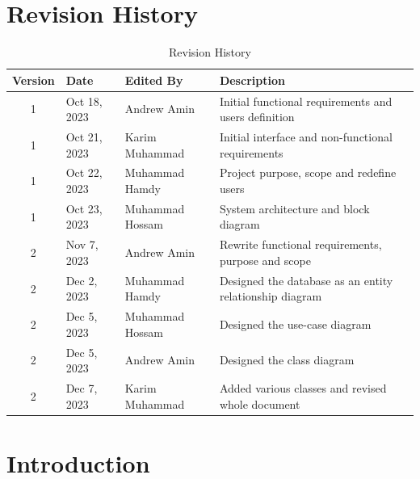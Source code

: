 \documentclass{BusMateSRS}
\def\nameAndrew{Andrew Amin}
\def\nameKarim{Karim Muhammad}
\def\nameHamdy{Muhammad Hamdy}
\def\nameHossam{Muhammad Hossam}
\begin{document}
\maketitle
\tableofcontents
\listoffigures
\listoftables

\chapter*{Revision History}
\begin{table}[h!]
  \centering
  \begin{tabularx}{\textwidth}{|c|l|l|X|}
    \hline
    \textbf{Version} & \textbf{Date} & \textbf{Edited By} & \textbf{Description} \\
    \hline
    1 & Oct 18, 2023 & \nameAndrew & 
    Initial functional requirements and users definition \\
    \hline
    1 & Oct 21, 2023 & \nameKarim & 
    Initial interface and non-functional requirements \\
    \hline
    1 & Oct 22, 2023 & \nameHamdy &
    Project purpose, scope and redefine users \\
    \hline
    1 & Oct 23, 2023 & \nameHossam &
    System architecture and block diagram \\
    \hline
    2 & Nov 7, 2023 & \nameAndrew & 
    Rewrite functional requirements, purpose and scope \\
    \hline
    2 & Dec 2, 2023 & \nameHamdy & 
    Designed the database as an entity relationship diagram \\
    \hline
    2 & Dec 5, 2023 & \nameHossam & 
    Designed the use-case diagram \\
    \hline
    2 & Dec 5, 2023 & \nameAndrew &
    Designed the class diagram  \\
    \hline
    2 & Dec 7, 2023 & \nameKarim &
    Added various classes and revised whole document \\
    \hline
  \end{tabularx}
  \caption{Revision History}
  \label{tab:revision-history}
\end{table}


\chapter{Introduction}
\end{document}
